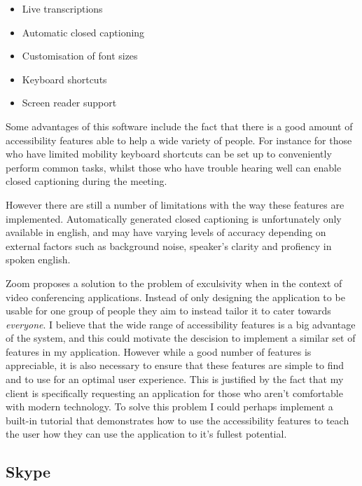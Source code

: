\begin{itemize}
  \item Live transcriptions
  \item Automatic closed captioning
  \item Customisation of font sizes
  \item Keyboard shortcuts
  \item Screen reader support
\end{itemize}

Some advantages of this software include the fact that there
is a good amount of accessibility features able to help a wide
variety of people. For instance for those who have limited 
mobility keyboard shortcuts can be set up to conveniently 
perform common tasks, whilst those who have trouble hearing
well can enable closed captioning during the meeting.

\vspace{0.2cm}

However there are still a number of limitations with the way 
these features are implemented. Automatically generated 
closed captioning is unfortunately only available in english,
and may have varying levels of accuracy depending on external
factors such as background noise, speaker's clarity and 
profiency in spoken english.

\vspace{0.2cm}

Zoom proposes a solution to the problem of exculsivity when in 
the context of video conferencing applications. Instead of only
designing the application to be usable for one group of people
they aim to instead tailor it to cater towards 
\textit{everyone}. I believe that the wide range of
accessibility features is a big advantage of the system, and 
this could motivate the descision to implement a similar set
of features in my application. However while a good number of 
features is appreciable, it is also necessary to ensure that 
these features are simple to find and to use for an optimal 
user experience. This is justified by the fact that my client
is specifically requesting an application for those who aren't
comfortable with modern technology. To solve this problem I 
could perhaps implement a built-in tutorial that demonstrates 
how to use the accessibility features to teach the user how 
they can use the application to it's fullest potential.

\subsection*{Skype}

